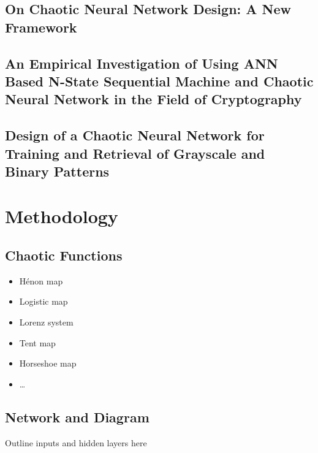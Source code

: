 \documentclass[conference]{IEEEtran}
\begin{document}
\subsection{\textbf{On Chaotic Neural Network Design: A New Framework}}\label{subsec:on-chaotic-neural-network-design:-a-new-framework}
\cite{Qin2017}
\subsection{\textbf{An Empirical Investigation of Using ANN Based N-State Sequential Machine and Chaotic Neural Network in the Field of Cryptography}}\label{subsec:an-empirical-investigation-of-using-ann-based-n-state-sequential-machine-and-chaotic-neural-network-in-the-field-of-cryptography}
\cite{Shukla2012}

\subsection{\textbf{Design of a Chaotic Neural Network for Training and Retrieval of Grayscale and Binary Patterns}}\label{subsec:design-of-a-chaotic-neural-network-for-training-and-retrieval-of-grayscale-and-binary-patterns}
\cite{TAHERKHANI20112824}

\section{Methodology}\label{sec:methodology}

\subsection{Chaotic Functions}\label{subsec:chaotic-functions}

\begin{itemize}
    \item Hénon map
    \item Logistic map
    \item Lorenz system
    \item Tent map
    \item Horseshoe map
    \item \ldots
\end{itemize}

\subsection{Network and Diagram}\label{subsec:network-and-diagram}

Outline inputs and hidden layers here
\end{document}
